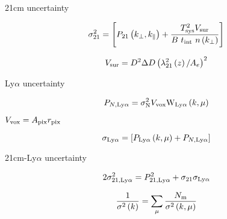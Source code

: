 21cm uncertainty

\begin{equation}
\sigma_{21}^2 = \left[ P_{21}\left(k_{\perp}, k_{\parallel} \right) + \frac{T^2_{\rm sys} V_{\rm sur}}{B \ t_{\rm int} \ n \left(k_{\perp}\right)} \right]
\end{equation}

\begin{equation}
V_{\rm sur} = D^2 \Delta D \left( \lambda_{21}^2 \left( z \right) / A_e\right)^2
\end{equation}


Ly$\alpha$ uncertainty

\begin{equation}
P_{N, \rm Ly\alpha} = \sigma_{\rm N}^2 V_{\rm vox} {\rm W}_{\rm Ly\alpha}\left(k, \mu \right)
\end{equation}

$V_{\rm vox} = A_{\rm pix} r_{\rm pix}$

\begin{equation}
\sigma_{\rm Ly\alpha} = \left[ P_{\rm Ly\alpha}\left(k, \mu \right) + P_{N, \rm Ly\alpha} \right]
\end{equation}

21cm-Ly$\alpha$ uncertainty


\begin{equation}
    2 \sigma^2_{21, \rm Ly\alpha} = P^2_{21, \rm Ly\alpha} + \sigma_{21} \sigma_{\rm Ly\alpha}
\end{equation}

\begin{equation}
\frac{1}{\sigma^2 \left( k \right)} = \sum_{\mu} \frac{N_{\rm m}}{\sigma^2 \left( k, \mu \right)}
\end{equation}
